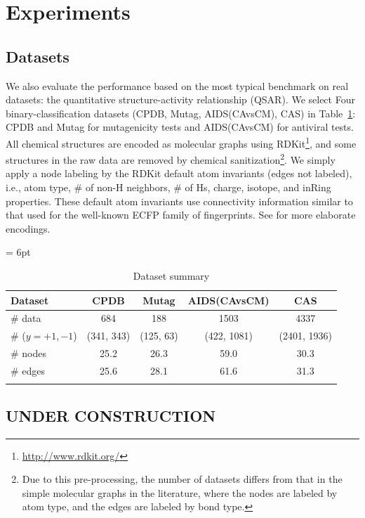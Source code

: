 \section{Experiments}
\subsection{Datasets}
We also evaluate the performance based on the most typical benchmark on real datasets:
the quantitative structure-activity relationship (QSAR). 
We select Four binary-classification datasets (CPDB, Mutag, AIDS(CAvsCM), CAS) in Table~\ref{tbl:dataset}: 
CPDB and Mutag for mutagenicity tests and AIDS(CAvsCM) for antiviral tests.
All chemical structures are encoded as molecular graphs using RDKit\footnote{\url{http://www.rdkit.org/}}, 
and some structures in the raw data are removed by chemical sanitization\footnote{
Due to this pre-processing, the number of datasets differs from that 
in the simple molecular graphs in the literature, 
where the nodes are labeled by atom type, and the edges are labeled by bond type.}.
We simply apply a node labeling by the RDKit default atom invariants (edges not labeled), i.e., 
atom type, \# of non-H neighbors, \# of Hs, charge, isotope, and inRing properties. 
These default atom invariants use connectivity information similar to that used for the well-known 
ECFP family of fingerprints\cite{Rogers:2010}. See \cite{Kearnes2016} for more elaborate encodings.

\tabcolsep = 6pt
\begin{table}[h]
  \centering
  \caption{Dataset summary}
  \label{tbl:dataset}
  	\begin{tabular}{lcccc}
		\thickhline
		Dataset			& CPDB           & Mutag        & AIDS(CAvsCM)     & CAS	\\  \hline
		\# data			& 684            & 188          & 1503             & 4337	\\
		\# ($y=+1,-1$)	& (341, 343)     & (125, 63)    & (422, 1081)      & (2401, 1936)	\\  
		\# nodes		& 25.2           & 26.3         & 59.0             & 30.3	\\  
		\# edges		& 25.6           & 28.1         & 61.6             & 31.3	\\  
		\thickhline
		\end{tabular}
\end{table}

\subsection{UNDER CONSTRUCTION}

